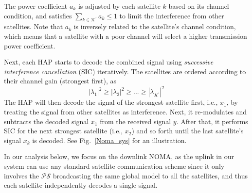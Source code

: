 \documentclass[letter,journal]{IEEEtran}
\newcommand{\blue}[1]{\textcolor{blue}{#1}}
\newcommand{\sref}[1]{Section~\ref{#1}}
\begin{document}

The power coefficient $a_k$ is adjusted by each satellite $k$ based on its channel condition, and satisfies $\sum_{k\in \mathcal{K}^{'}} {a_k} \leq 1$ to limit the interference from other satellites. Note that $a_k$ is inversely related to the satellite's channel condition, which means that a satellite with a poor channel will select a higher transmission power coefficient. 

Next, each HAP starts to decode the combined signal using {\em successive interference cancellation} (SIC) iteratively. The satellites are ordered according to their channel gain (strongest first), as %
\begin{equation}
|\lambda_1|^2 \geq |\lambda_2|^2 \geq ... \geq |\lambda_{K^{'}}|^2
\end{equation}
The HAP will then decode the signal of the strongest satellite first, i.e., $x_1$, by treating the signal from other satellites as interference. Next, it re-modulates and subtracts the decoded signal $x_1$ from the received signal $y$. After that, it performs SIC for the next strongest satellite (i.e., $x_2$) and so forth until the last satellite's signal $x_{k}$ is decoded. See Fig.~\ref{Noma_sys} for an illustration.

In our analysis below, we focus on the downlink NOMA, as the uplink in our system can use any standard satellite communication scheme since it only involves the $\mathcal{PS}$ broadcasting the same global model to all the satellites, and thus each satellite independently decodes a single signal.
\end{document}
